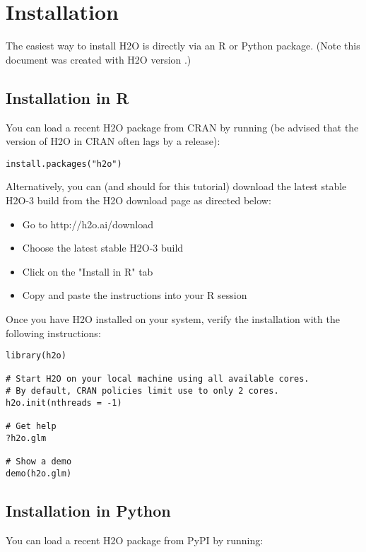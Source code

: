 \section{Installation} 

The easiest way to install H2O is directly via an R or Python package.
(Note this document was created with H2O version \waterVersion.)

\subsection{Installation in R}

You can load a recent H2O package from CRAN by running (be advised
that the version of H2O in CRAN often lags by a release):

\begin{lstlisting}[style=R]
install.packages("h2o")
\end{lstlisting}

Alternatively, you can (and should for this tutorial) download the
latest stable H2O-3 build from the H2O download page as directed
below:

\begin{itemize}
\item Go to http://h2o.ai/download
\item Choose the latest stable H2O-3 build
\item Click on the "Install in R" tab
\item Copy and paste the instructions into your R session
\end{itemize}

\bigskip
Once you have H2O installed on your system, verify the installation
with the following instructions:

\begin{lstlisting}[style=R]
library(h2o)

# Start H2O on your local machine using all available cores.
# By default, CRAN policies limit use to only 2 cores.
h2o.init(nthreads = -1)

# Get help
?h2o.glm

# Show a demo
demo(h2o.glm)
\end{lstlisting}

\subsection{Installation in Python}

You can load a recent H2O package from PyPI by running:


